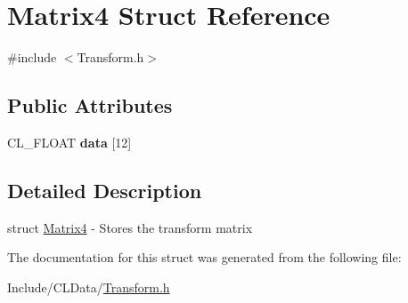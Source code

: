\hypertarget{struct_matrix4}{}\section{Matrix4 Struct Reference}
\label{struct_matrix4}


{\ttfamily \#include $<$Transform.\+h$>$}

\subsection*{Public Attributes}
\begin{DoxyCompactItemize}
\item 
C\+L\+\_\+\+F\+L\+O\+AT {\bfseries data} \mbox{[}12\mbox{]}\hypertarget{struct_matrix4_aa05e355ee533bd48f15215057e77dea1}{}\label{struct_matrix4_aa05e355ee533bd48f15215057e77dea1}

\end{DoxyCompactItemize}


\subsection{Detailed Description}
struct \hyperlink{struct_matrix4}{Matrix4} -\/ Stores the transform matrix 

The documentation for this struct was generated from the following file\+:\begin{DoxyCompactItemize}
\item 
Include/\+C\+L\+Data/\hyperlink{_transform_8h}{Transform.\+h}\end{DoxyCompactItemize}
